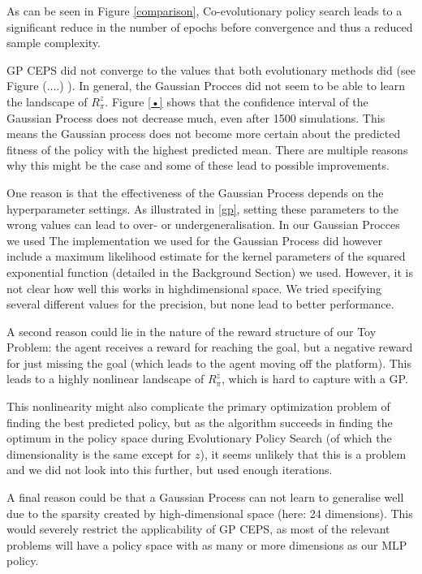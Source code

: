 As can be seen in Figure \ref{comparison}, Co-evolutionary policy search leads to a significant reduce in the number of epochs before convergence and thus a reduced sample complexity. 

GP CEPS did not converge to the values that both evolutionary methods did (see Figure (....) ). In general, the Gaussian Procces did not seem to be able to learn the landscape of $R_{\pi}^z$. Figure \ref{•} shows that the confidence interval of the Gaussian Process does not decrease much, even after 1500 simulations. This means the Gaussian process does not become more certain about the predicted fitness of the policy with the highest predicted mean.
There are multiple reasons why this might be the case and some of these lead to possible improvements. 

One reason is that the effectiveness of the Gaussian Process depends on the hyperparameter settings. As illustrated in \ref{gp}, setting these parameters to the wrong values can lead to over- or undergeneralisation. In our Gaussian Procces we used  The implementation we used for the Gaussian Process did however include a maximum likelihood estimate for the kernel parameters of the squared exponential function (detailed in the Background Section) we used. However, it is not clear how well this works in highdimensional space. We tried specifying several different values for the precision, but none lead to better performance. 

A second reason could lie in the nature of the reward   structure of our Toy Problem: the agent receives a reward for reaching the goal, but a negative reward for just missing the goal (which leads to the agent moving off the platform). This leads to a highly nonlinear landscape of $R_{\pi}^z$, which is hard to capture with a GP. 

This nonlinearity might also complicate the primary optimization problem of finding the best predicted policy, but as the algorithm succeeds in finding the optimum in the policy space during Evolutionary Policy Search (of which the dimensionality is the same except for $z$), it seems unlikely that this is a problem and we did not look into this further, but used enough iterations.

A final reason could be that a Gaussian Process can not learn to generalise well due to the sparsity created by high-dimensional space (here: 24 dimensions). This would severely restrict the applicability of GP CEPS, as most of the relevant problems will have a policy space with as many or more dimensions as our MLP policy.

